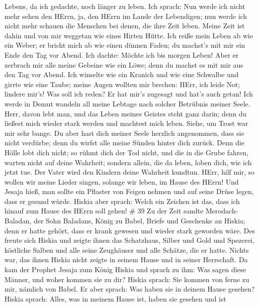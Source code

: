 Lebens, da ich gedachte, noch länger zu leben.  Ich sprach:
Nun werde ich nicht mehr sehen den HErrn, ja, den HErrn im Lande der
Lebendigen; nun werde ich nicht mehr schauen die Menschen bei denen, die
ihre Zeit leben.  Meine Zeit ist dahin und von mir weggetan
wie eines Hirten Hütte. Ich reiße mein Leben ab wie ein Weber; er bricht
mich ab wie einen dünnen Faden; du machst's mit mir ein Ende den Tag vor
Abend.  Ich dachte: Möchte ich bis morgen Leben! Aber er
zerbrach mir alle meine Gebeine wie ein Löwe; denn du machst es mit mir
aus den Tag vor Abend.  Ich winselte wie ein Kranich und
wie eine Schwalbe und girrte wie eine Taube; meine Augen wollten mir
brechen: HErr, ich leide Not; lindere mir's!  Was soll ich
reden? Er hat mir's zugesagt und hat's auch getan! Ich werde in Demut
wandeln all meine Lebtage nach solcher Betrübnis meiner Seele.
 Herr, davon lebt man, und das Leben meines Geistes steht
ganz darin; denn du ließest mich wieder stark werden und machtest mich
leben.  Siehe, um Trost war mir sehr bange. Du aber hast
dich meiner Seele herzlich angenommen, dass sie nicht verdürbe; denn du
wirfst alle meine Sünden hinter dich zurück.  Denn die
Hölle lobt dich nicht; so rühmt dich der Tod nicht, und die in die Grube
fahren, warten nicht auf deine Wahrheit;  sondern allein,
die da leben, loben dich, wie ich jetzt tue. Der Vater wird den Kindern
deine Wahrheit kundtun.  HErr, hilf mir, so wollen wir
meine Lieder singen, solange wir leben, im Hause des HErrn!
 Und Jesaja hieß, man sollte ein Pflaster von Feigen nehmen
und auf seine Drüse legen, dass er gesund würde.  Hiskia
aber sprach: Welch ein Zeichen ist das, dass ich hinauf zum Hause des
HErrn soll gehen! \# 39  Zu der Zeit sandte
Merodach-Baladan, der Sohn Baladans, König zu Babel, Briefe und
Geschenke an Hiskia; denn er hatte gehört, dass er krank gewesen und
wieder stark geworden wäre.  Des freute sich Hiskia und
zeigte ihnen das Schatzhaus, Silber und Gold und Spezerei, köstliche
Salben und alle seine Zeughäuser und alle Schätze, die er hatte. Nichts
war, das ihnen Hiskia nicht zeigte in seinem Hause und in seiner
Herrschaft.  Da kam der Prophet Jesaja zum König Hiskia und
sprach zu ihm: Was sagen diese Männer, und woher kommen sie zu dir?
Hiskia sprach: Sie kommen von ferne zu mir, nämlich von Babel.
 Er aber sprach: Was haben sie in deinem Hause gesehen?
Hiskia sprach: Alles, was in meinem Hause ist, haben sie gesehen und ist
